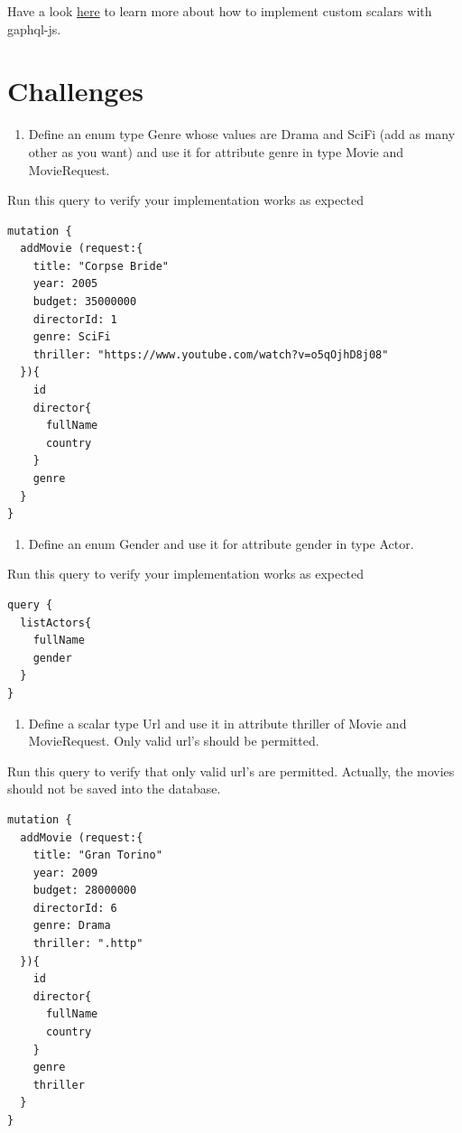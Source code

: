 \documentclass[]{book}
\providecommand{\tightlist}{%
  \setlength{\itemsep}{0pt}\setlength{\parskip}{0pt}}
\begin{document}
Have a look
\href{https://graphql.org/graphql-js/type/\#graphqlscalartype}{here} to
learn more about how to implement custom scalars with gaphql-js.

\section{Challenges}\label{challenges-1}

\begin{enumerate}
\def\labelenumi{\arabic{enumi}.}
\tightlist
\item
  Define an enum type Genre whose values are Drama and SciFi (add as
  many other as you want) and use it for attribute genre in type Movie
  and MovieRequest.
\end{enumerate}

Run this query to verify your implementation works as expected

\begin{verbatim}
mutation {
  addMovie (request:{
    title: "Corpse Bride"
    year: 2005
    budget: 35000000
    directorId: 1
    genre: SciFi
    thriller: "https://www.youtube.com/watch?v=o5qOjhD8j08"
  }){
    id
    director{
      fullName
      country
    }
    genre
  }
}
\end{verbatim}

\begin{enumerate}
\def\labelenumi{\arabic{enumi}.}
\setcounter{enumi}{1}
\tightlist
\item
  Define an enum Gender and use it for attribute gender in type Actor.
\end{enumerate}

Run this query to verify your implementation works as expected

\begin{verbatim}
query {
  listActors{
    fullName
    gender
  }
}
\end{verbatim}

\begin{enumerate}
\def\labelenumi{\arabic{enumi}.}
\setcounter{enumi}{2}
\tightlist
\item
  Define a scalar type Url and use it in attribute thriller of Movie and
  MovieRequest. Only valid url's should be permitted.
\end{enumerate}

Run this query to verify that only valid url's are permitted. Actually,
the movies should not be saved into the database.

\begin{verbatim}
mutation {
  addMovie (request:{
    title: "Gran Torino"
    year: 2009
    budget: 28000000
    directorId: 6
    genre: Drama
    thriller: ".http"
  }){
    id
    director{
      fullName
      country
    }
    genre
    thriller
  }
}
\end{verbatim}
\end{document}
